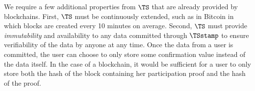 We require a few additional properties from \(\TS\) that are already provided by blockchains.
First, \(\TS\) must be continuously extended, such as in Bitcoin in which blocks are created every 10 minutes on average.
Second, \(\TS\) must provide \emph{immutability} and availability to any data committed through \(\TSstamp\) to ensure verifiability of the data by anyone at any time.
Once the data from a user is committed, the user can choose to only store some confirmation value instead of the data itself.
In the case of a blockchain, it would be sufficient for a user to only store both the hash of the block containing her participation proof and the hash of the proof. 

